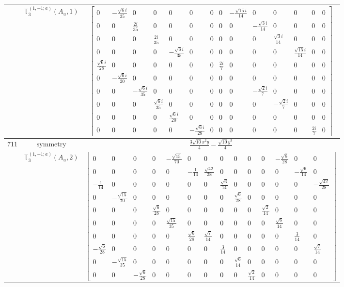 \documentclass[fleqn,8pt,landscape]{jsarticle}
\begin{document}
\begin{longtable}{ccc}
$  $ & $ \mathbb{T}_{3}^{(1,-1;a)}(A_{u},1) $ & $ \begin{bmatrix} 0 & - \frac{\sqrt{6} i}{35} & 0 & 0 & 0 & 0 & 0 & 0 & - \frac{\sqrt{15} i}{14} & 0 & 0 & 0 & 0 & 0 \\ 0 & 0 & \frac{2 i}{35} & 0 & 0 & 0 & 0 & 0 & 0 & - \frac{\sqrt{3} i}{14} & 0 & 0 & 0 & 0 \\ 0 & 0 & 0 & \frac{2 i}{35} & 0 & 0 & 0 & 0 & 0 & 0 & \frac{\sqrt{3} i}{14} & 0 & 0 & 0 \\ 0 & 0 & 0 & 0 & - \frac{\sqrt{6} i}{35} & 0 & 0 & 0 & 0 & 0 & 0 & \frac{\sqrt{15} i}{14} & 0 & 0 \\ \frac{\sqrt{6} i}{28} & 0 & 0 & 0 & 0 & 0 & 0 & \frac{2 i}{7} & 0 & 0 & 0 & 0 & 0 & 0 \\ 0 & - \frac{\sqrt{6} i}{20} & 0 & 0 & 0 & 0 & 0 & 0 & 0 & 0 & 0 & 0 & 0 & 0 \\ 0 & 0 & - \frac{\sqrt{6} i}{35} & 0 & 0 & 0 & 0 & 0 & 0 & - \frac{\sqrt{2} i}{7} & 0 & 0 & 0 & 0 \\ 0 & 0 & 0 & \frac{\sqrt{6} i}{35} & 0 & 0 & 0 & 0 & 0 & 0 & - \frac{\sqrt{2} i}{7} & 0 & 0 & 0 \\ 0 & 0 & 0 & 0 & \frac{\sqrt{6} i}{20} & 0 & 0 & 0 & 0 & 0 & 0 & 0 & 0 & 0 \\ 0 & 0 & 0 & 0 & 0 & - \frac{\sqrt{6} i}{28} & 0 & 0 & 0 & 0 & 0 & 0 & \frac{2 i}{7} & 0 \end{bmatrix} $ \\ \hline
$ 711 $ & $ \text{symmetry} $ & $ \frac{3 \sqrt{10} x^{2} y}{4} - \frac{\sqrt{10} y^{3}}{4} $ \\
$  $ & $ \mathbb{T}_{3}^{(1,-1;a)}(A_{u},2) $ & $ \begin{bmatrix} 0 & 0 & 0 & 0 & - \frac{\sqrt{15}}{70} & 0 & 0 & 0 & 0 & 0 & 0 & - \frac{\sqrt{6}}{28} & 0 & 0 \\ 0 & 0 & 0 & 0 & 0 & - \frac{1}{14} & \frac{\sqrt{42}}{28} & 0 & 0 & 0 & 0 & 0 & - \frac{\sqrt{6}}{14} & 0 \\ - \frac{1}{14} & 0 & 0 & 0 & 0 & 0 & 0 & \frac{\sqrt{6}}{14} & 0 & 0 & 0 & 0 & 0 & - \frac{\sqrt{42}}{28} \\ 0 & - \frac{\sqrt{15}}{70} & 0 & 0 & 0 & 0 & 0 & 0 & \frac{\sqrt{6}}{28} & 0 & 0 & 0 & 0 & 0 \\ 0 & 0 & 0 & \frac{\sqrt{6}}{28} & 0 & 0 & 0 & 0 & 0 & 0 & \frac{\sqrt{2}}{14} & 0 & 0 & 0 \\ 0 & 0 & 0 & 0 & \frac{\sqrt{15}}{35} & 0 & 0 & 0 & 0 & 0 & 0 & \frac{\sqrt{6}}{14} & 0 & 0 \\ 0 & 0 & 0 & 0 & 0 & \frac{\sqrt{6}}{28} & \frac{\sqrt{7}}{14} & 0 & 0 & 0 & 0 & 0 & \frac{3}{14} & 0 \\ - \frac{\sqrt{6}}{28} & 0 & 0 & 0 & 0 & 0 & 0 & \frac{3}{14} & 0 & 0 & 0 & 0 & 0 & \frac{\sqrt{7}}{14} \\ 0 & - \frac{\sqrt{15}}{35} & 0 & 0 & 0 & 0 & 0 & 0 & \frac{\sqrt{6}}{14} & 0 & 0 & 0 & 0 & 0 \\ 0 & 0 & - \frac{\sqrt{6}}{28} & 0 & 0 & 0 & 0 & 0 & 0 & \frac{\sqrt{2}}{14} & 0 & 0 & 0 & 0 \end{bmatrix} $ \\ \hline

\end{longtable}
\end{document}

